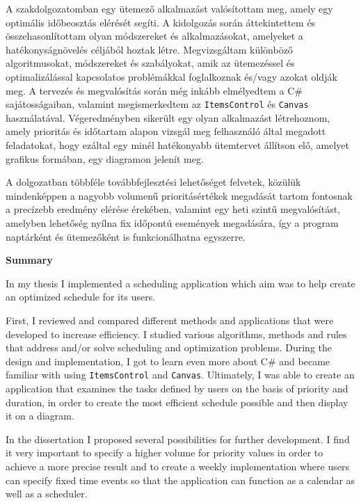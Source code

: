 
A szakdolgozatomban egy ütemező alkalmazást valósítottam meg, amely egy optimális időbeosztás elérését segíti. A kidolgozás során áttekintettem és összehasonlítottam olyan módszereket és alkalmazásokat, amelyeket a hatékonyságnövelés céljából hoztak létre. Megvizsgáltam különböző algoritmusokat, módszereket és szabályokat, amik az ütemezéssel és optimalizálással kapcsolatos problémákkal foglalkoznak és/vagy azokat oldják meg. A tervezés és megvalósítás során még inkább elmélyedtem a C\# sajátosságaiban, valamint megismerkedtem az \texttt{ItemsControl} és \texttt{Canvas} használatával. Végeredményben sikerült egy olyan alkalmazást létrehoznom, amely prioritás és időtartam alapon vizsgál meg felhasználó által megadott feladatokat, hogy ezáltal egy minél hatékonyabb ütemtervet állítson elő, amelyet grafikus formában, egy diagramon jelenít meg.

A dolgozatban többféle továbbfejlesztési lehetőséget felvetek, közülük mindenképpen a nagyobb volumenű prioritásértékek megadását tartom fontosnak a precízebb eredmény elérése érekében, valamint egy heti szintű megvalósítást, amelyben lehetőség nyílna fix időpontú események megadására, így a program naptárként és ütemezőként is funkcionálhatna egyszerre.

\newpage
\begin{LARGE}
\textbf{Summary}
\end{LARGE}
\vskip 1cm

In my thesis I implemented a scheduling application which aim was to help create an optimized schedule for its users.

First, I reviewed and compared different methods and applications that were developed to increase efficiency. I studied various algorithms, methods and rules that address and/or solve scheduling and optimization problems. During the design and implementation, I got to learn even more about C\# and became familiar with using \texttt{ItemsControl} and \texttt{Canvas}. Ultimately, I was able to create an application that examines the tasks defined by users on the basis of priority and duration, in order to create the most efficient schedule possible and then display it on a diagram.

In the dissertation I proposed several possibilities for further development. I find it very important to specify a higher volume for priority values in order to achieve a more precise result and to create a weekly implementation where users can specify fixed time events so that the application can function as a calendar as well as a scheduler.

